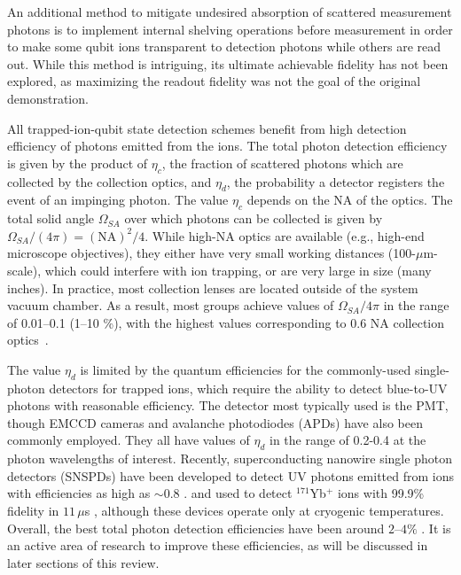 \documentclass[%
12pt,
 amsmath,amssymb,
]{revtex4-2}
\begin{document}
An additional method to mitigate undesired absorption of scattered measurement photons is to implement internal shelving operations before measurement in order to make some qubit ions transparent to detection photons \cite{RoosControl2004} while others are read out. While this method is intriguing, its ultimate achievable fidelity has not been explored, as maximizing the readout fidelity was not the goal of the original demonstration.

All trapped-ion-qubit state detection schemes benefit from high detection efficiency of photons emitted from the ions.  The total photon detection efficiency is given by the product of $\eta_c$, the fraction of scattered photons which are collected by the collection optics, and $\eta_d$, the probability a detector registers the event of an impinging photon. The value $\eta_c$ depends on the NA of the optics.  The total solid angle $\Omega_{SA}$ over which photons can be collected is given by $\Omega_{SA}/(4 \pi) = (\textrm{NA})^2/4$.  While high-NA optics are available (e.g., high-end microscope objectives), they either have very small working distances (100-$\mu$m-scale), which could interfere with ion trapping, or are very large in size (many inches). In practice, most collection lenses are located outside of the system vacuum chamber. As a result, most groups achieve values of $\Omega_{SA}/4\pi$ in the range of 0.01--0.1 (1--10 \%), with the highest values corresponding to 0.6 NA collection optics~\cite{noek2013high}.

The value $\eta_d$ is limited by the quantum efficiencies for the commonly-used single-photon detectors for trapped ions, which require the ability to detect blue-to-UV photons with reasonable efficiency.  The detector most typically used is the PMT, though EMCCD cameras and avalanche photodiodes (APDs) have also been commonly employed.  They all have values of $\eta_d$ in the range of 0.2-0.4 at the photon wavelengths of interest.  Recently, superconducting nanowire single photon detectors (SNSPDs) have been developed to detect UV photons emitted from ions with efficiencies as high as $\sim$0.8 \cite{SlichterSNSPD2017, WollmanSNSPD2017}.  and used to detect $^{171}$Yb$^+$ ions with 99.9\% fidelity in $11 \, \mu$s \cite{CrainSNSPDdetect2019}, although these devices operate only at cryogenic temperatures. Overall, the best total photon detection efficiencies have been around $2$--$4 \%$ \cite{noek2013high,CrainSNSPDdetect2019}.  It is an active area of research to improve these efficiencies, as will be discussed in later sections of this review.
\end{document}
